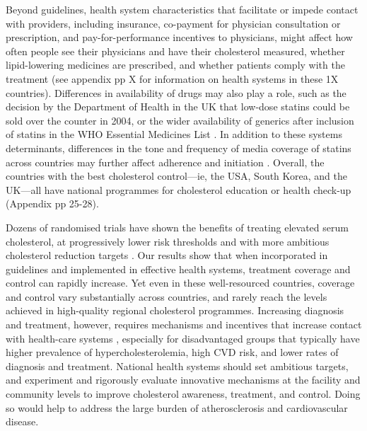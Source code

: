 \documentclass[12pt]{article}
\begin{document}
\begin{refsection}
Beyond guidelines, health system characteristics that facilitate or impede contact with providers, including insurance, co-payment for physician consultation or prescription, and pay-for-performance incentives to physicians, might affect how often people see their physicians and have their cholesterol measured, whether lipid-lowering medicines are prescribed, and whether patients comply with the treatment (see appendix pp X for information on health systems in these 1X countries). Differences in availability of drugs may also play a role, such as the decision by the Department of Health in the UK that low-dose statins could be sold over the counter \cite{lancet_otc_2004} in 2004, or the wider availability of generics after inclusion of statins in the WHO Essential Medicines List \cite{kishore_modernizing_2018}. In addition to these systems determinants, differences in the tone and frequency of media coverage of statins across countries may further affect adherence and initiation \cite{matthews_impact_2016}. Overall, the countries with the best cholesterol control—ie, the USA, South Korea, and the UK—all have national programmes for cholesterol education or health check-up (Appendix pp 25-28). 

Dozens of randomised trials have shown the benefits of treating elevated serum cholesterol, at progressively lower risk thresholds \cite{cholesterol_treatment_trialists_ctt_collaborators_effects_2012} and with more ambitious cholesterol reduction targets \cite{cholesterol_treatment_trialists_ctt_collaboration_efficacy_2005,cholesterol_treatment_trialists_ctt_collaborators_effects_2012}. Our results show that when incorporated in guidelines and implemented in effective health systems, treatment coverage and control can rapidly increase. Yet even in these well-resourced countries, coverage and control vary substantially across countries, and rarely reach the levels achieved in high-quality regional cholesterol programmes. Increasing diagnosis and treatment, however, requires mechanisms and incentives that increase contact with health-care systems \cite{asch_effect_2015}, especially for disadvantaged groups that typically have higher prevalence of hypercholesterolemia, high CVD risk,  and lower rates of diagnosis and treatment. National health systems should set ambitious targets, and experiment and rigorously evaluate innovative mechanisms at the facility and community levels to improve cholesterol awareness, treatment, and control. Doing so would help to address the large burden of atherosclerosis and cardiovascular disease.



\end{refsection}
\end{document}
